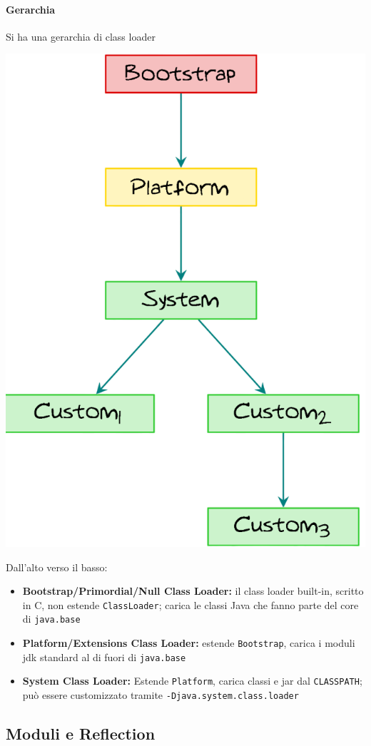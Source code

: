 \newpage

\paragraph{Gerarchia} Si ha una gerarchia di class loader

\begin{center}
    \includegraphics[width=0.45\columnwidth]{img/rij/clHierarchy}
\end{center}

Dall'alto verso il basso:
\begin{itemize}
    \item \textbf{Bootstrap/Primordial/Null Class Loader:} il class loader built-in, scritto in C, non estende \texttt{ClassLoader}; carica le classi Java che fanno parte del core di \texttt{java.base}

    \item \textbf{Platform/Extensions Class Loader:} estende \texttt{Bootstrap}, carica i moduli jdk standard al di fuori di \texttt{java.base}

    \item \textbf{System Class Loader:} Estende \texttt{Platform}, carica classi e jar dal \texttt{CLASSPATH}; può essere customizzato tramite \texttt{-Djava.system.class.loader}
\end{itemize}



\subsection{Moduli e Reflection}

